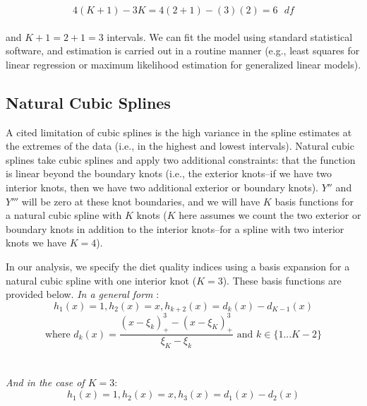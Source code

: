 \documentclass{article}
\begin{document}
$$4(K+1)-3K=4(2+1)-(3)(2)=6\text{ }{df}$$
\\
\noindent and $K+1=2+1=3$ intervals. We can fit the model using standard statistical software, and estimation is carried out in a routine manner (e.g., least squares for linear regression or maximum likelihood estimation for generalized linear models).

\vspace{0.5cm} %
\subsection{Natural Cubic Splines}
\hspace{\parindent} A cited limitation of cubic splines is the high variance in the spline estimates at the extremes of the data (i.e., in the highest and lowest intervals). \supercite{hastie_elements_2009} Natural cubic splines take cubic splines and apply two additional constraints: that the function is linear beyond the boundary knots (i.e., the exterior knots--if we have two interior knots, then we have two additional exterior or boundary knots). $Y''$ and $Y'''$ will be zero at these knot boundaries, and we will have $K$ basis functions for a natural cubic spline with $K$ knots ($K$ here assumes we count the two exterior or boundary knots in addition to the interior knots--for a spline with two interior knots we have $K=4$). 

\hspace{\parindent} In our analysis, we specify the diet quality indices using a basis expansion for a natural cubic spline with one interior knot ($K=3$). These basis functions are provided below.
\newline
\newline
\textit{In a general form}\supercite{hastie_elements_2009} :
\\
$$h_1(x)=1,h_2(x)=x, h_{k+2}(x)=d_k(x)-d_{K-1}(x)$$
$$\text{where } d_k(x)=\frac{(x-\xi_k)^3_+-(x-\xi_K)^3_+}{\xi_K-\xi_k} \text{ and } k\in\{1...K-2\}$$
\\
\\
\textit{And in the case of $K=3$}:
$$h_1(x)=1, h_2(x)=x, h_{3}(x)=d_1(x)-d_{2}(x)$$
\\
\\
\end{document}
